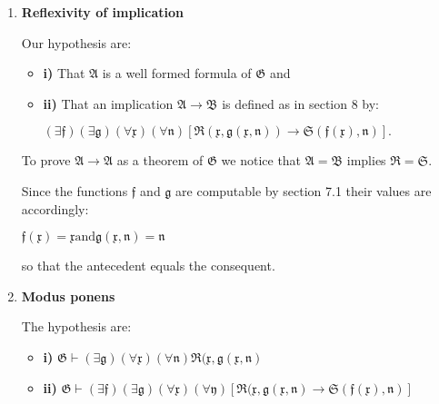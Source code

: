 \documentclass[12pt]{article}
\begin{document}
\begin{enumerate}

\item \textbf{Reflexivity of implication}

Our hypothesis are:

\begin{itemize}
\item \textbf{i)} That $\mathfrak{A}$ is a well formed formula of $\mathfrak{G}$ and

\item \textbf{ii)} That an implication $\mathfrak{A} \rightarrow \mathfrak{B}$ is defined as in section 8 by:

\begin{center}
$(\exists \mathfrak{f}) (\exists \mathfrak{g}) (\forall \mathfrak{x}) (\forall \mathfrak{n}) [\mathfrak{R} (\mathfrak{x}, \mathfrak{g} (\mathfrak{x}, \mathfrak{n})) \rightarrow \mathfrak{S} (\mathfrak{f} (\mathfrak{x}), \mathfrak{n})].$
\end{center}

\end{itemize}

To prove $\mathfrak{A} \rightarrow \mathfrak{A}$ as a theorem of $\mathfrak{G}$ we notice that $\mathfrak{A} = \mathfrak{B}$ implies $\mathfrak{R} = \mathfrak{S}.$

Since the functions $\mathfrak{f}$ and $\mathfrak{g}$ are computable by section 7.1 their values are accordingly:

\begin{center}
$\mathfrak{f} (\mathfrak{x}) = \mathfrak{x} \text{and} \mathfrak{g} (\mathfrak{x}, \mathfrak{n}) = \mathfrak{n}$
\end{center}

so that the antecedent equals the consequent.

\item \textbf{Modus ponens}

The hypothesis are:

\begin{itemize}
\item \textbf{i)} $\mathfrak{G} \vdash (\exists \mathfrak{g}) (\forall \mathfrak{x}) (\forall \mathfrak{n}) \mathfrak{R} (\mathfrak{x}, \mathfrak{g} (\mathfrak{x}, \mathfrak{n})$

\item \textbf{ii)} $\mathfrak{G} \vdash (\exists \mathfrak{f}) (\exists \mathfrak{g}) (\forall \mathfrak{x}) (\forall \mathfrak{y}) [\mathfrak{R} (\mathfrak{x}, \mathfrak{g} (\mathfrak{x}, \mathfrak{n}) \rightarrow \mathfrak{S} (\mathfrak{f} (\mathfrak{x}), \mathfrak{n})]$ 


\end{itemize}
\end{enumerate}
\end{document}
